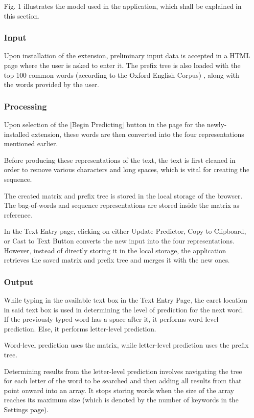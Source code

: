 \documentclass[journal]{./IEEE/IEEEtran}
\begin{document}
Fig. 1 illustrates the model used in the application, which shall be explained in this section.

\subsubsection{Input}
Upon installation of the extension, preliminary input data is accepted in a HTML page where the user is asked to enter it. The prefix tree is also loaded with the top 100 common words (according to the Oxford English Corpus) \cite{OxfordFacts}, along with the words provided by the user.

\subsubsection{Processing}
Upon selection of the [Begin Predicting] button in the page for the newly-installed extension, these words are then converted into the four representations mentioned earlier.

Before producing these representations of the text, the text is first cleaned in order to remove various characters and long spaces, which is vital for creating the sequence.

The created matrix and prefix tree is stored in the local storage of the browser. The bag-of-words and sequence representations are stored inside the matrix as reference.

In the Text Entry page, clicking on either Update Predictor, Copy to Clipboard, or Cast to Text Button converts the new input into the four representations. However, instead of directly storing it in the local storage, the application retrieves the saved matrix and prefix tree and merges it with the new ones.

\subsubsection{Output}
While typing in the available text box in the Text Entry Page, the caret location in said text box is used in determining the level of prediction for the next word. If the previously typed word has a space after it, it performs word-level prediction. Else, it performs letter-level prediction.

Word-level prediction uses the matrix, while letter-level prediction uses the prefix tree.

Determining results from the letter-level prediction involves navigating the tree for each letter of the word to be searched and then adding all results from that point onward into an array. It stops storing words when the size of the array reaches its maximum size (which is denoted by the number of keywords in the Settings page).
\end{document}
